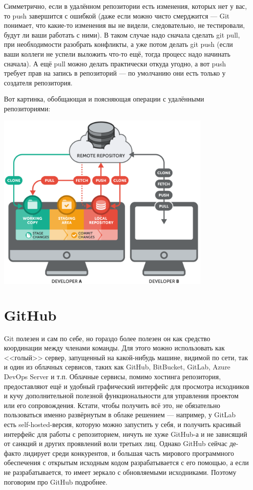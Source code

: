 \documentclass{../../text-style}
\begin{document}
Симметрично, если в удалённом репозитории есть изменения, которых нет у вас, то push завершится с ошибкой (даже если можно чисто смерджится --- Git понимает, что какие-то изменения вы не видели, следовательно, не тестировали, будут ли ваши работать с ними). В таком случае надо сначала сделать git pull, при необходимости разобрать конфликты, а уже потом делать git push (если ваши коллеги не успели выложить что-то ещё, тогда процесс надо начинать сначала). А ещё pull можно делать практически откуда угодно, а вот push требует прав на запись в репозиторий --- по умолчанию они есть только у создателя репозитория.

Вот картинка, обобщающая и поясняющая операции с удалёнными репозиториями:

\begin{center}
    \includegraphics[width=0.8\textwidth]{remoteRepos.png}
\end{center}

\section{GitHub}

Git полезен и сам по себе, но гораздо более полезен он как средство координации между членами команды. Для этого можно использовать как <<голый>> сервер, запущенный на какой-нибудь машине, видимой по сети, так и один из облачных сервисов, таких как GitHub, BitBucket, GitLab, Azure DevOps Server и т.п. Облачные сервисы, помимо хостинга репозитория, предоставляют ещё и удобный графический интерфейс для просмотра исходников и кучу дополнительной полезной функциональности для управления проектом или его сопровождения. Кстати, чтобы получить всё это, не обязательно пользоваться именно развёрнутым в облаке решением --- например, у GitLab есть self-hosted-версия, которую можно запустить у себя, и получить красивый интерфейс для работы с репозиторием, ничуть не хуже GitHub-а и не зависящий от санкций и других проявлений воли третьих лиц. Однако GitHub сейчас де-факто лидирует среди конкурентов, и большая часть мирового программного обеспечения с открытым исходным кодом разрабатывается с его помощью, а если не разрабатывается, то имеет зеркало с обновляемыми исходниками. Поэтому поговорим про GitHub подробнее.
\end{document}
